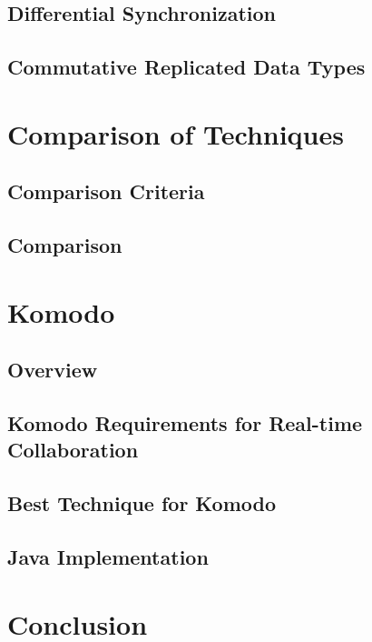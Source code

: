 \documentclass[12pt,oneside]{fithesis2}
\begin{document}
\section{Differential Synchronization}
\section{Commutative Replicated Data Types}
\chapter{Comparison of Techniques}
\section{Comparison Criteria}
\section{Comparison}
\chapter{Komodo}
\section{Overview}
\section{Komodo Requirements for Real-time Collaboration}
\section{Best Technique for Komodo}
\section{Java Implementation}
\chapter{Conclusion}
 
 
\end{document}
